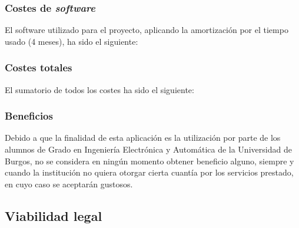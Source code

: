 \subsubsection{Costes de \textit{software}}

El software utilizado para el proyecto, aplicando la amortización por el tiempo usado (4 meses), ha sido el siguiente:


\subsubsection{Costes totales}

El sumatorio de todos los costes ha sido el siguiente:


\subsubsection{Beneficios}

Debido a que la finalidad de esta aplicación es la utilización por parte de los alumnos de Grado en Ingeniería Electrónica y Automática de la Universidad de Burgos, no se considera en ningún momento obtener beneficio alguno, siempre y cuando la institución no quiera otorgar cierta cuantía por los servicios prestado, en cuyo caso se aceptarán gustosos.

\subsection{Viabilidad legal}

